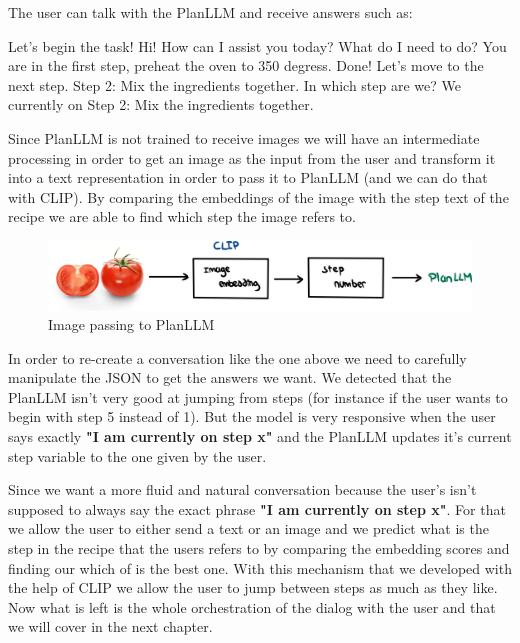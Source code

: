 \documentclass[runningheads]{llncs}
\begin{document}
The user can talk with the PlanLLM and receive answers such as:\\[5pt]

\hspace{0.5cm} %
\begin{minipage}{1.2\textwidth} %
\begin{dialogue}
 Let's begin the task! 
 Hi! How can I assist you today? 
 What do I need to do?
 You are in the first step, preheat the oven to 350 degress.
 Done! Let's move to the next step.
 Step 2: Mix the ingredients together.
 In which step are we?
 We currently on Step 2: Mix the ingredients together.\\[5pt]
\end{dialogue}
\end{minipage}

Since PlanLLM is not trained to receive images we will have an intermediate processing in order to get an image as the input from the user and transform it into a text representation in order to pass it to PlanLLM (and we can do that with CLIP). By comparing the embeddings of the image with the step text of the recipe we are able to find which step the image refers to.

\begin{figure}[!htbp]
    \center
    \includegraphics[scale=0.08]{images/planLLM.jpg}
    \caption{Image passing to PlanLLM}
\end{figure}

In order to re-create a conversation like the one above we need to carefully manipulate the JSON to get the answers we want. We detected that the PlanLLM isn't very good at jumping from steps (for instance if the user wants to begin with step 5 instead of 1). But the model is very responsive when the user says exactly \textbf{"I am currently on step x"} and the PlanLLM updates it's current step variable to the one given by the user.

Since we want a more fluid and natural conversation because the user's isn't supposed to always say the exact phrase \textbf{"I am currently on step x"}. For that we allow the user to either send a text or an image and we predict what is the step in the recipe that the users refers to by comparing the embedding scores and finding our which of is the best one. With this mechanism that we developed with the help of CLIP we allow the user to jump between steps as much as they like. Now what is left is the whole orchestration of the dialog with the user and that we will cover in the next chapter.
\end{document}
